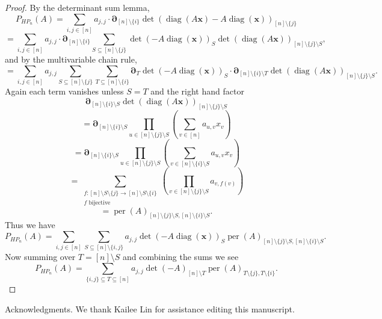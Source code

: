 \documentclass{article}
\newcommand{\diag}{\operatorname{diag}}
\newcommand{\per}{\operatorname{per}}
\theoremstyle{theorem}
\theoremstyle{definition}
\begin{document}
\begin{proof}
    By the determinant sum lemma,
    \[
        P_{HP_n}(A)=\sum_{i,j\in[n]}a_{j,j}\cdot\boldsymbol{\partial}_{[n]\setminus\{i\}}\det(\diag(A\boldsymbol{x})-A\diag(\boldsymbol{x}))_{[n]\setminus\{j\}}
    \]
    \[
        =\sum_{i,j\in[n]}a_{j,j}\cdot\boldsymbol{\partial}_{[n]\setminus\{i\}}\sum_{S\subseteq[n]\setminus\{j\}}\det(-A\diag(\boldsymbol{x}))_{S}\det(\diag(A\boldsymbol{x}))_{[n]\setminus\{j\}\setminus S},
    \]
    and by the multivariable chain rule,
    \[
        =\sum_{i,j\in[n]}a_{j,j}\sum_{S\subseteq[n]\setminus\{j\}}\sum_{T\subseteq[n]\setminus\{i\}}\boldsymbol{\partial}_{T}\det(-A\diag(\boldsymbol{x}))_{S}\cdot\boldsymbol{\partial}_{[n]\setminus\{i\}\setminus T}\det(\diag(A\boldsymbol{x}))_{[n]\setminus\{j\}\setminus S}.
    \]
    Again each term vanishes unless $S=T$ and the right hand factor
    \[
        \boldsymbol{\partial}_{[n]\setminus\{i\}\setminus S}\det(\diag(A\boldsymbol{x}))_{[n]\setminus\{j\}\setminus S}
    \]
    \[
        =\boldsymbol{\partial}_{[n]\setminus\{i\}\setminus S}\prod_{u\in[n]\setminus\{j\}\setminus S}\left(\sum_{v\in[n]}a_{u,v}x_v\right)
    \]
    \[
        =\boldsymbol{\partial}_{[n]\setminus\{i\}\setminus S}\prod_{u\in[n]\setminus\{j\}\setminus S}\left(\sum_{v\in[n]\setminus\{i\}\setminus S}a_{u,v}x_v\right)
    \]
    \[
        =\sum_{\substack{
            f:[n]\setminus S\setminus\{j\}\rightarrow[n]\setminus S\setminus\{i\} \\
            f\text{ bijective}
        }} \left(\prod_{v\in[n]\setminus\{j\}\setminus S}a_{v,f(v)}\right)
    \]
    \[
        =\per(A)_{[n]\setminus\{j\}\setminus S,[n]\setminus\{i\}\setminus S}.
    \]
    Thus we have
    \[
        P_{HP_n}(A)=\sum_{i,j\in[n]}\sum_{S\subseteq[n]\setminus\{i,j\}}a_{j,j}\det(-A\diag(\boldsymbol{x}))_{S}\per(A)_{[n]\setminus\{j\}\setminus S,[n]\setminus\{i\}\setminus S}.
    \]
    Now summing over $T=[n]\setminus S$ and combining the sums we see
    \[
        P_{HP_n}(A)=\sum_{\{i,j\}\subseteq T\subseteq[n]}a_{j,j}\det(-A)_{[n]\setminus T}\per(A)_{T\setminus \{j\},T\setminus \{i\}}.
    \]
\end{proof}

\begin{acknowledgment}{Acknowledgments.}
We thank Kailee Lin for assistance editing this manuscript.
\end{acknowledgment}





\vfill\eject
\end{document}
